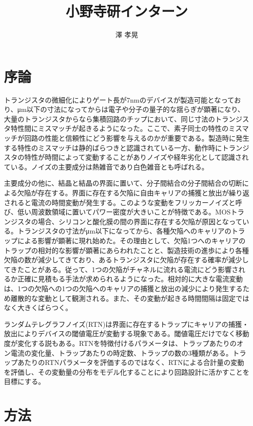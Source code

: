 \documentclass{jsarticle}
\begin{document}
\title{小野寺研インターン}
\author{澤 孝晃}
\maketitle

\section{序論}
\label{sec:intro}
トランジスタの微細化によりゲート長が7nmのデバイスが製造可能となっており、μm以下の寸法になってからは電子や分子の量子的な揺らぎが顕著になり、大量のトランジスタからなら集積回路のチップにおいて、同じ寸法のトランジスタ特性間にミスマッチが起きるようになった。ここで、素子同士の特性のミスマッチが回路の性能と信頼性にどう影響を与えるのかが重要である。製造時に発生する特性のミスマッチは静的ばらつきと認識されている一方、動作時にトランジスタの特性が時間によって変動することがありノイズや経年劣化として認識されている。ノイズの主要成分は熱雑音であり白色雑音とも呼ばれる。

主要成分の他に、結晶と結晶の界面に置いて、分子間結合の分子間結合の切断による欠陥が存在する。界面に存在する欠陥に自由キャリアの捕獲と放出が繰り返されると電流の時間変動が発生する。このような変動をフリッカーノイズと呼び、低い周波数領域に置いてパワー密度が大きいことが特徴である。MOSトランジスタの場合、シリコンと酸化膜の間の界面に存在する欠陥が原因となっている。トランジスタの寸法がμm以下になってから、各種欠陥へのキャリアのトラップによる影響が顕著に現れ始めた。その理由として、欠陥1つへのキャリアのトラップの相対的な影響が顕著にあらわれたことと、製造技術の進歩により各種欠陥の数が減少してきており、あるトランジスタに欠陥が存在する確率が減少してきたことがある。従って、1つの欠陥がチャネルに流れる電流にどう影響されるか正確に見積もる手法が求められるようになった。相対的に大きな電流変動は、1つの欠陥への1つの欠陥へのキャリアの捕獲と放出の減少により発生するため離散的な変動として観測される。また、その変動が起きる時間間隔は固定ではなく大きくばらつく。

ランダムテレグラフノイズ(RTN)は界面に存在するトラップにキャリアの捕獲・放出によりデバイスの閾値電圧が変動する現象である。閾値電圧だけでなく移動度が変化する説もある。RTNを特徴付けるパラメータは、トラップあたりのオン電流の変化量、トラップあたりの時定数、トラップの数の3種類がある。トラップあたりのRTNパラメータを評価するのではなく、RTNによる合計量の変動を評価し、その変動量の分布をモデル化することにより回路設計に活かすことを目標にする。



\section{方法}
\label{sec:method}
\end{document}
